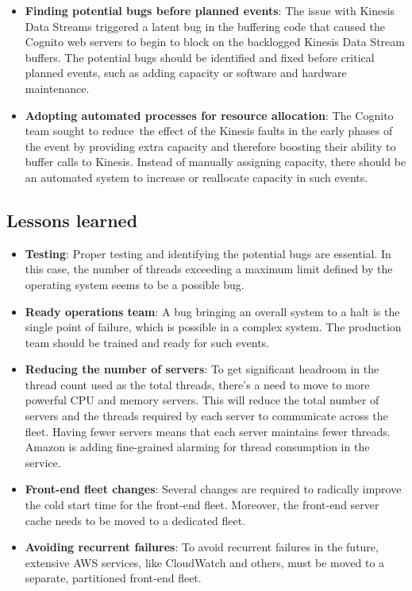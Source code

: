 \begin{itemize}
\item
\protect{}\label{elWcRlZbwhZATD0vUMW0y}
\textbf{Finding potential bugs before planned events}: The issue with Kinesis Data Streams triggered a latent bug in the buffering code that caused the Cognito web servers to begin to block on the backlogged Kinesis Data Stream buffers. The potential bugs should be identified and fixed before critical planned events, such as adding capacity or software and hardware maintenance.
\item
\protect{}\label{Vw_JOA1pUph9Ayrs96DHA}
\textbf{Adopting automated processes for resource allocation}: The Cognito team sought to reduce~the effect of the Kinesis faults in the early phases of the event by providing extra capacity and therefore boosting their ability to buffer calls to Kinesis. Instead of manually assigning capacity, there should be an automated system to increase or reallocate capacity in such events.
\end{itemize}

\subsection{Lessons learned}\label{TFhUcq8uZreb_XE6ROX2X}

\begin{itemize}
\item
\protect{}\label{mQj_75aNFK4Sgq-dQi_5f}
\textbf{Testing}: Proper testing and identifying the potential bugs are essential. In this case, the number of threads exceeding a maximum limit defined by the operating system seems to be a possible bug.
\item
\protect{}\label{WUBIGuHPIqWJM8ksqmmjP}
\textbf{Ready operations team}: A bug bringing an overall system to a halt is the single point of failure, which is possible in a complex system. The production team should be trained and ready for such events.
\item
\protect{}\label{GeV8HDT5DQFJ-GiiPlss0}
\textbf{Reducing the number of servers}: To get significant headroom in the thread count used as the total threads, there's a need to move to more powerful CPU and memory servers. This will reduce the total number of servers and the threads required by each server to communicate across the fleet. Having fewer servers means that each server maintains fewer threads. Amazon is adding fine-grained alarming for thread consumption in the service.
\item
\protect{}\label{xAZHcksg4S6-wkipQR0M0}
\textbf{Front-end fleet changes}: Several changes are required to radically improve the cold start time for the front-end fleet. Moreover, the front-end server cache needs to be moved to a dedicated fleet.
\item
\protect{}\label{AS4y1GdoZG5St3obTpTG-}
\textbf{Avoiding recurrent failures}: To avoid recurrent failures in the future, extensive AWS services, like CloudWatch and others, must be moved to a separate, partitioned front-end fleet.
\end{itemize}

